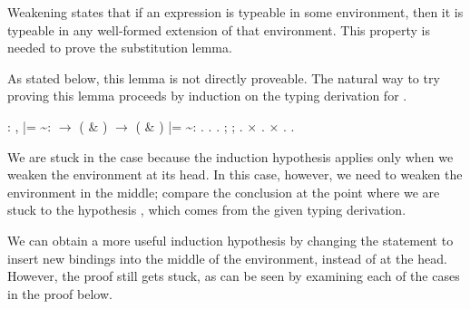 \documentclass[12pt]{report}
\begin{document}
 Weakening states that if an expression is typeable in some
    environment, then it is typeable in any well-formed extension of
    that environment.  This property is needed to prove the
    substitution lemma.


    As stated below, this lemma is not directly proveable.  The natural
    way to try proving this lemma proceeds by induction on the typing
    derivation for .

\begin{coqdoccode}
\coqdocemptyline
\coqdocnoindent
{}  : \coqdockw{\ensuremath{\forall}}    ,\coqdoceol
\coqdocindent{1.50em}
 |=  \~{}:  \ensuremath{\rightarrow} \coqdoceol
\coqdocindent{1.50em}
 ( \& ) \ensuremath{\rightarrow}\coqdoceol
\coqdocindent{1.50em}
( \& ) |=  \~{}: .\coqdoceol
\coqdocnoindent
{}.\coqdoceol
\coqdocindent{1.00em}
 .  ;  ; .\coqdoceol
\coqdocindent{1.00em}
\ensuremath{\times} .\coqdoceol
\coqdocindent{1.00em}
\ensuremath{\times}   . \coqdocnoindent
{}.\coqdoceol
\coqdocemptyline
\end{coqdoccode}
We are stuck in the  case because the induction
    hypothesis  applies only when we weaken the environment at its
    head.  In this case, however, we need to weaken the environment in
    the middle; compare the conclusion at the point where we are stuck
    to the hypothesis , which comes from the given typing derivation.


    We can obtain a more useful induction hypothesis by changing the
    statement to insert new bindings into the middle of the
    environment, instead of at the head.  However, the proof still
    gets stuck, as can be seen by examining each of the cases in
    the proof below. 
\end{document}
